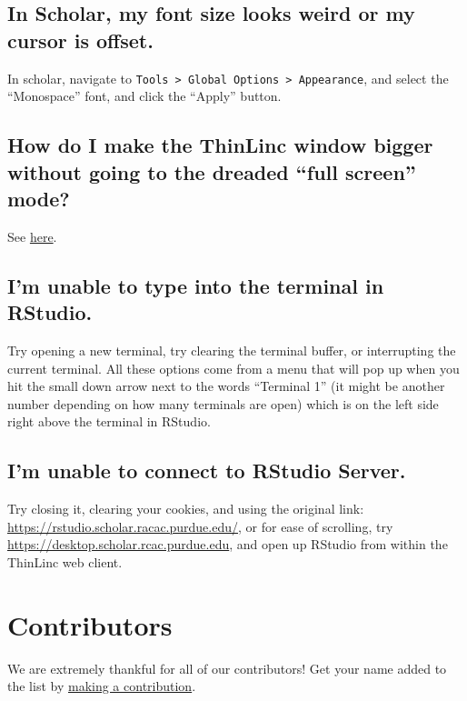 \documentclass[
]{book}
\begin{document}
\hypertarget{in-scholar-my-font-size-looks-weird-or-my-cursor-is-offset.}{%
\section{In Scholar, my font size looks weird or my cursor is offset.}\label{in-scholar-my-font-size-looks-weird-or-my-cursor-is-offset.}}

In scholar, navigate to \texttt{Tools\ \textgreater{}\ Global\ Options\ \textgreater{}\ Appearance}, and select the ``Monospace'' font, and click the ``Apply'' button.

\hypertarget{how-do-i-make-the-thinlinc-window-bigger-without-going-to-the-dreaded-full-screen-mode}{%
\section{How do I make the ThinLinc window bigger without going to the dreaded ``full screen'' mode?}\label{how-do-i-make-the-thinlinc-window-bigger-without-going-to-the-dreaded-full-screen-mode}}

See \href{https://home.cc.umanitoba.ca/~psgendb/local/public_html/remote/desktop/thinlinc/thinlinc.local.html}{here}.

\hypertarget{im-unable-to-type-into-the-terminal-in-rstudio.}{%
\section{I'm unable to type into the terminal in RStudio.}\label{im-unable-to-type-into-the-terminal-in-rstudio.}}

Try opening a new terminal, try clearing the terminal buffer, or interrupting the current terminal. All these options come from a menu that will pop up when you hit the small down arrow next to the words ``Terminal 1'' (it might be another number depending on how many terminals are open) which is on the left side right above the terminal in RStudio.~

\hypertarget{im-unable-to-connect-to-rstudio-server.}{%
\section{I'm unable to connect to RStudio Server.}\label{im-unable-to-connect-to-rstudio-server.}}

Try closing it, clearing your cookies, and using the original link: \url{https://rstudio.scholar.racac.purdue.edu/}, or for ease of scrolling, try \url{https://desktop.scholar.rcac.purdue.edu}, and open up RStudio from within the ThinLinc web client.

\hypertarget{section}{%
\section{}\label{section}}

\hypertarget{contributors}{%
\chapter{Contributors}\label{contributors}}

We are extremely thankful for all of our contributors! Get your name added to the list by \protect\hyperlink{how-to-contribute}{making a contribution}.
\end{document}
